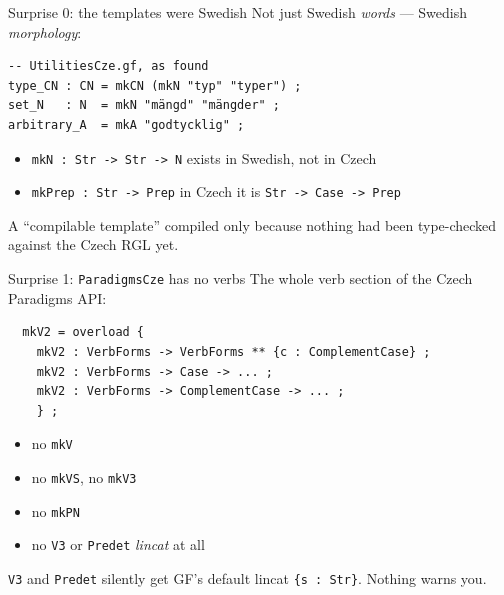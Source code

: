 \documentclass[10pt,aspectratio=169]{beamer}
\newcommand{\bad}[1]{\textcolor{warn}{#1}}
\begin{document}
\begin{frame}[fragile]{Surprise 0: the templates were Swedish}
  Not just Swedish \emph{words} --- Swedish \emph{morphology}:

\begin{lstlisting}
-- UtilitiesCze.gf, as found
type_CN : CN = mkCN (mkN "typ" "typer") ;
set_N   : N  = mkN "mängd" "mängder" ;
arbitrary_A  = mkA "godtycklig" ;
\end{lstlisting}

  \begin{itemize}
    \item \texttt{mkN : Str -> Str -> N} \quad exists in Swedish, \bad{not in Czech}
    \item \texttt{mkPrep : Str -> Prep} \quad in Czech it is \texttt{Str -> Case -> Prep}
  \end{itemize}

  \vspace{0.5em}
  A ``compilable template'' compiled only because nothing had been type-checked
  against the Czech RGL yet.
\end{frame}

\begin{frame}[fragile]{Surprise 1: \texttt{ParadigmsCze} has no verbs}
  The whole verb section of the Czech Paradigms API:

\begin{lstlisting}
  mkV2 = overload {
    mkV2 : VerbForms -> VerbForms ** {c : ComplementCase} ;
    mkV2 : VerbForms -> Case -> ... ;
    mkV2 : VerbForms -> ComplementCase -> ... ;
    } ;
\end{lstlisting}

  \begin{itemize}
    \item no \texttt{mkV}
    \item no \texttt{mkVS}, no \texttt{mkV3}
    \item no \texttt{mkPN}
    \item no \texttt{V3} or \texttt{Predet} \emph{lincat} at all
  \end{itemize}

  \vspace{0.5em}
  \texttt{V3} and \texttt{Predet} silently get GF's default lincat \texttt{\{s : Str\}}.
  Nothing warns you.
\end{frame}
\end{document}
